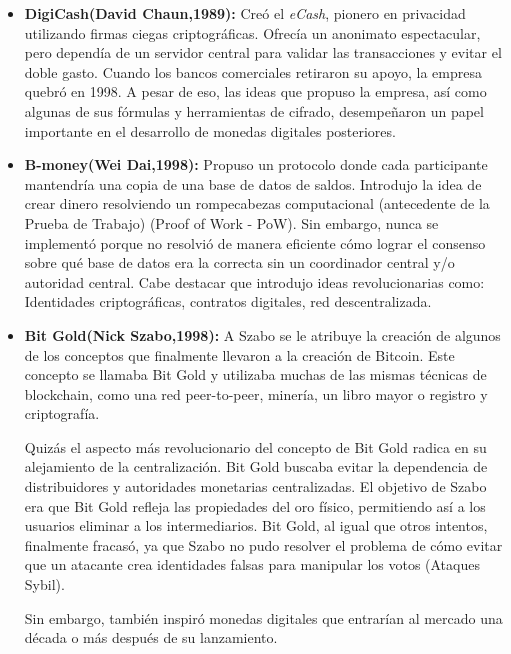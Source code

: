 \documentclass[12pt,a4paper]{article}
\begin{document}
\begin{itemize}
  \item \textbf{DigiCash(David Chaun,1989):}
        Creó el \textit{eCash}, pionero en privacidad utilizando firmas ciegas criptográficas. Ofrecía
        un anonimato espectacular, pero dependía de un servidor central para validar las
        transacciones y evitar el doble gasto. Cuando los bancos comerciales retiraron su
        apoyo, la empresa quebró en 1998.
        A pesar de eso, las ideas que propuso la empresa, así como algunas de sus
        fórmulas y herramientas de cifrado, desempeñaron un papel importante en el
        desarrollo de monedas digitales posteriores.

  \item \textbf{B-money(Wei Dai,1998):}
        Propuso un protocolo donde cada participante mantendría una copia de una base de
        datos de saldos. Introdujo la idea de crear dinero resolviendo un rompecabezas
        computacional (antecedente de la Prueba de Trabajo) (Proof of Work - PoW). Sin
        embargo, nunca se implementó porque no resolvió de manera eficiente cómo lograr
        el consenso sobre qué base de datos era la correcta sin un coordinador central y/o
        autoridad central.
        Cabe destacar que introdujo ideas revolucionarias como: Identidades criptográficas,
        contratos digitales, red descentralizada.

  \item \textbf{Bit Gold(Nick Szabo,1998):}
        A Szabo se le atribuye la creación de algunos de los conceptos que finalmente
        llevaron a la creación de Bitcoin. Este concepto se llamaba Bit Gold y utilizaba
        muchas de las mismas técnicas de blockchain, como una red peer-to-peer, minería,
        un libro mayor o registro y criptografía.

        Quizás el aspecto más revolucionario del concepto de Bit Gold radica en su
        alejamiento de la centralización. Bit Gold buscaba evitar la dependencia de
        distribuidores y autoridades monetarias centralizadas. El objetivo de Szabo era que
        Bit Gold refleja las propiedades del oro físico, permitiendo así a los usuarios eliminar
        a los intermediarios. Bit Gold, al igual que otros intentos, finalmente fracasó, ya que
        Szabo no pudo resolver el problema de cómo evitar que un atacante crea
        identidades falsas para manipular los votos (Ataques Sybil).

        Sin embargo, también inspiró monedas digitales que entrarían al mercado una
        década o más después de su lanzamiento.


\end{itemize}
\end{document}
